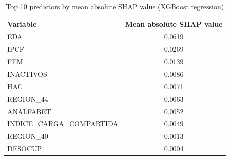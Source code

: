 \begin{table}
\caption{Top 10 predictors by mean absolute SHAP value (XGBoost regression)}
\label{tab:shap_regression}
\begin{tabular}{lc}
\toprule
Variable & Mean absolute SHAP value \\
\midrule
EDA & 0.0619 \\
IPCF & 0.0269 \\
FEM & 0.0139 \\
INACTIVOS & 0.0086 \\
HAC & 0.0071 \\
REGION\_44 & 0.0063 \\
ANALFABET & 0.0052 \\
INDICE\_CARGA\_COMPARTIDA & 0.0049 \\
REGION\_40 & 0.0013 \\
DESOCUP & 0.0004 \\
\bottomrule
\end{tabular}
\end{table}
